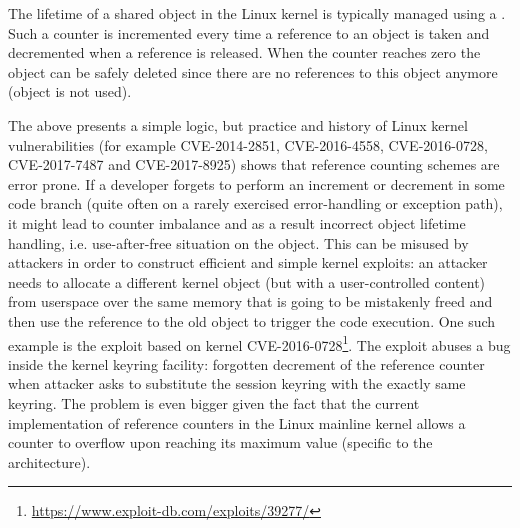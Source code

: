 The lifetime of a shared object in the Linux kernel is typically managed using a . 
Such a counter is incremented every time a reference to an object is taken and decremented when a reference is released. 
When the counter reaches zero the object can be safely deleted since there are no references to this object anymore (object is not used).

The above presents a simple logic, but practice and history of Linux kernel vulnerabilities (for example CVE-2014-2851, CVE-2016-4558, CVE-2016-0728, CVE-2017-7487 and CVE-2017-8925) shows that reference counting schemes are error prone. If a developer forgets to perform an increment or decrement in some code branch (quite often on a rarely exercised error-handling or exception path), it might lead to counter imbalance and as a result incorrect object lifetime handling, i.e. use-after-free situation on the object. This can be misused by attackers in order to construct efficient and simple kernel exploits: an attacker needs to allocate a different kernel object (but with a user-controlled content) from userspace over the same memory that is going to be mistakenly freed and then use the reference to the old object to trigger the code execution. One such example is the exploit based on kernel CVE-2016-0728\footnote{\url{https://www.exploit-db.com/exploits/39277/}}. The exploit abuses a bug inside the kernel keyring facility: forgotten decrement of the reference counter when attacker asks to substitute the session keyring with the exactly same keyring. 
The problem is even bigger given the fact that the current implementation of reference counters in the Linux mainline kernel allows a counter to overflow upon reaching its maximum value (specific to the architecture). 

